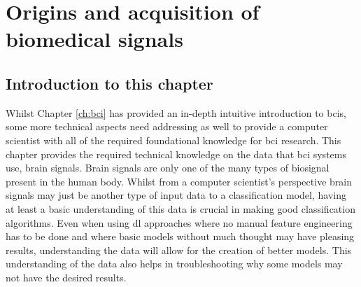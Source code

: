 




\glsresetall

\chapter{Origins and acquisition of biomedical signals}
\label{ch:biomedical_signals}

\section{Introduction to this chapter}
\label{sec:biomedical_signals_introduction}

Whilst Chapter \ref{ch:bci} has provided an in-depth intuitive introduction to \glspl{bci}, some more technical aspects need addressing as well to provide a computer scientist with all of the required foundational knowledge for \gls{bci} research.
This chapter provides the required technical knowledge on the data that \gls{bci} systems use, brain signals.
Brain signals are only one of the many types of \gls{biosignal} present in the human body.
Whilst from a computer scientist's perspective brain signals may just be another type of input data to a classification model, having at least a basic understanding of this data is crucial in making good classification algorithms.
Even when using \gls{dl} approaches where no manual feature engineering has to be done and where basic models without much thought may have pleasing results, understanding the data will allow for the creation of better models.
This understanding of the data also helps in troubleshooting why some models may not have the desired results.

